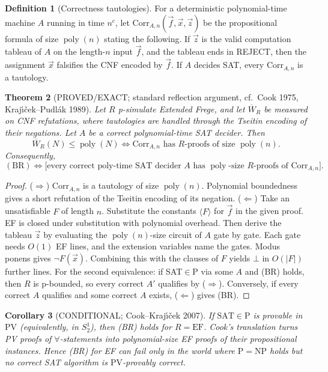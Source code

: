 \documentclass[11pt]{article}
\newtheorem{theorem}{Theorem}
\newtheorem{corollary}[theorem]{Corollary}
\theoremstyle{definition}
\newtheorem{definition}[theorem]{Definition}
\newcommand{\Wb}{\overline W}
\newcommand{\poly}{\operatorname{poly}}
\begin{document}
\begin{definition}[Correctness tautologies]
For a deterministic polynomial-time machine $A$ running in time $n^c$, let
$\mathrm{Corr}_{A,n}(\vec f,\vec x,\vec z)$ be the propositional formula of size
$\poly(n)$ stating the following. If $\vec z$ is the valid computation tableau of $A$ on
the length-$n$ input $\vec f$, and the tableau ends in REJECT, then the assignment
$\vec x$ falsifies the CNF encoded by $\vec f$. If $A$ decides SAT, every
$\mathrm{Corr}_{A,n}$ is a tautology.
\end{definition}

\begin{theorem}[PROVED/EXACT; standard reflection argument, cf.\ Cook 1975, Kraj\'{\i}\v{c}ek--Pudl\'ak 1989]\label{thm:corr}
Let $R$ p-simulate Extended Frege, and let $\Wb_R$ be measured on CNF refutations, where
tautologies are handled through the Tseitin encoding of their negations. Let $A$ be a
correct polynomial-time SAT decider. Then
\[
\Wb_R(N)\le\poly(N)\iff \mathrm{Corr}_{A,n}\text{ has $R$-proofs of size }\poly(n).
\]
Consequently,
\[
(\mathrm{BR})\iff\Big[\text{every correct poly-time SAT decider }A\text{ has }\poly\text{-size }R\text{-proofs of }\mathrm{Corr}_{A,n}\Big].
\]
\end{theorem}
\begin{proof}
($\Rightarrow$) $\mathrm{Corr}_{A,n}$ is a tautology of size $\poly(n)$. Polynomial
boundedness gives a short refutation of the Tseitin encoding of its negation.
($\Leftarrow$) Take an unsatisfiable $F$ of length $n$. Substitute the constants
$\langle F\rangle$ for $\vec f$ in the given proof. EF is closed under substitution with
polynomial overhead. Then derive the tableau $\vec z$ by evaluating the $\poly(n)$-size
circuit of $A$ gate by gate. Each gate needs $O(1)$ EF lines, and the extension
variables name the gates. Modus ponens gives $\neg F(\vec x)$. Combining this with the
clauses of $F$ yields $\bot$ in $O(|F|)$ further lines. For the second equivalence: if
SAT$\in$P via some $A$ and (BR) holds, then $R$ is p-bounded, so every correct $A'$
qualifies by ($\Rightarrow$). Conversely, if every correct $A$ qualifies and some correct
$A$ exists, ($\Leftarrow$) gives (BR).
\end{proof}

\begin{corollary}[CONDITIONAL; Cook--Kraj\'{\i}\v{c}ek 2007]
If $\mathrm{SAT}\in\mathrm{P}$ is \emph{provable in $\mathrm{PV}$} (equivalently, in
$S^1_2$), then (BR) holds for $R=\mathrm{EF}$. Cook's translation turns PV proofs of
$\forall$-statements into polynomial-size EF proofs of their propositional instances.
Hence (BR) for EF can fail only in the world where $\mathrm{P}=\mathrm{NP}$ holds but no
correct SAT algorithm is $\mathrm{PV}$-provably correct.
\end{corollary}
\end{document}
